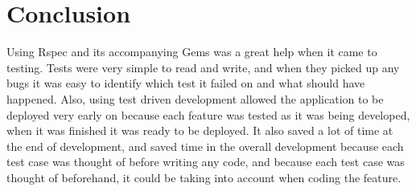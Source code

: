 \section{Conclusion}
Using Rspec and its accompanying Gems was a great help when it came to testing. Tests were very simple to read and write, and when they picked up any bugs it was easy to identify which test it failed on and what should have happened. Also, using test driven development allowed the application to be deployed very early on because each feature was tested as it was being developed, when it was finished it was ready to be deployed. It also saved a lot of time at the end of development, and saved time in the overall development because each test case was thought of before writing any code, and because each test case was thought of beforehand, it could be taking into account when coding the feature.